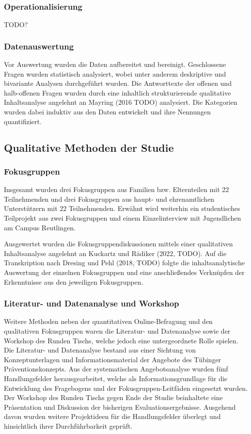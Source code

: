 \subsubsection{Operationalisierung}

TODO?

\subsubsection{Datenauswertung}

Vor Auswertung wurden die Daten aufbereitet und bereinigt. Geschlossene Fragen wurden statistisch analysiert, wobei unter anderem deskriptive und bivariante Analysen durchgeführt wurden. Die Antworttexte der offenen und halb-offenen Fragen wurden durch eine inhaltlich strukturierende qualitative Inhaltsanalyse angelehnt an Mayring (2016 TODO) analysiert. Die Kategorien wurden dabei induktiv aus den Daten entwickelt und ihre Nennungen quantifiziert.

\subsection{Qualitative Methoden der Studie}

\subsubsection{Fokusgruppen}

Insgesamt wurden drei Fokusgruppen aus Familien bzw. Elternteilen mit 22 Teilnehmenden und drei Fokusgruppen aus haupt- und ehrenamtlichen Unterstützern mit 22 Teilnehmenden. Erwähnt wird weiterhin ein studentisches Teilprojekt aus zwei Fokusgruppen und einem Einzelinterview mit Jugendlichen am Campus Reutlingen.

Ausgewertet wurden die Fokusgruppendiskussionen mittels einer qualitativen Inhaltsanalyse angelehnt an Kuckartz und Rädiker (2022, TODO). Auf die Transkription nach Dresing und Pehl (2018, TODO) folgte die inhaltsanalytische Auswertung der einzelnen Fokusgruppen und eine anschließendes Verknüpfen der Erkenntnisse aus den jeweiligen Fokusgruppen.

\subsubsection{Literatur- und Datenanalyse und Workshop}

Weitere Methoden neben der quantitativen Online-Befragung und den qualitativen Fokusgruppen waren die Literatur- und Datenanalyse sowie der Workshop des Runden Tischs, welche jedoch eine untergeordnete Rolle spielen. Die Literatur- und Datenanalyse bestand aus einer Sichtung von Konzeptunterlagen und Informationsmaterial der Angebote des Tübinger Präventionskonzepts. Aus der systematischen Angebotsanalyse wurden fünf Handlungsfelder herausgearbeitet, welche als Informationsgrundlage für die Entwicklung des Fragebogens und der Fokusgruppen-Leitfäden eingesetzt wurden. Der Workshop des Runden Tischs gegen Ende der Studie beinhaltete eine Präsentation und Diskussion der bisherigen Evaluationsergebnisse. Ausgehend davon wurden weitere Projektideen für die Handlungsfelder überlegt und hinsichtlich ihrer Durchführbarkeit geprüft.
